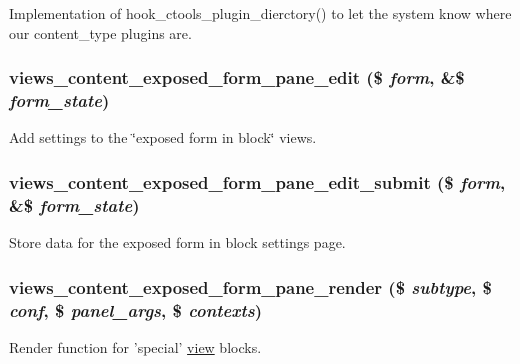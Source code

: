 \label{views__content_8module_ad80b6f3ed37ac841a555f303d0bc0175}
Implementation of hook\_\-ctools\_\-plugin\_\-dierctory() to let the system know where our content\_\-type plugins are. \hypertarget{views__content_8module_aa1cc8e44cc4b89d09d0f245735a8d638}{
\subsubsection[{views\_\-content\_\-exposed\_\-form\_\-pane\_\-edit}]{\setlength{\rightskip}{0pt plus 5cm}views\_\-content\_\-exposed\_\-form\_\-pane\_\-edit (\$ {\em form}, \/  \&\$ {\em form\_\-state})}}
\label{views__content_8module_aa1cc8e44cc4b89d09d0f245735a8d638}
Add settings to the \char`\"{}exposed form in block\char`\"{} views. \hypertarget{views__content_8module_a18f6505d323ff42d01e7354cf73e97fc}{
\subsubsection[{views\_\-content\_\-exposed\_\-form\_\-pane\_\-edit\_\-submit}]{\setlength{\rightskip}{0pt plus 5cm}views\_\-content\_\-exposed\_\-form\_\-pane\_\-edit\_\-submit (\$ {\em form}, \/  \&\$ {\em form\_\-state})}}
\label{views__content_8module_a18f6505d323ff42d01e7354cf73e97fc}
Store data for the exposed form in block settings page. \hypertarget{views__content_8module_a59edb5639e9d11e8883d2750bd8b9988}{
\subsubsection[{views\_\-content\_\-exposed\_\-form\_\-pane\_\-render}]{\setlength{\rightskip}{0pt plus 5cm}views\_\-content\_\-exposed\_\-form\_\-pane\_\-render (\$ {\em subtype}, \/  \$ {\em conf}, \/  \$ {\em panel\_\-args}, \/  \$ {\em contexts})}}
\label{views__content_8module_a59edb5639e9d11e8883d2750bd8b9988}
Render function for 'special' \hyperlink{classview}{view} blocks.

